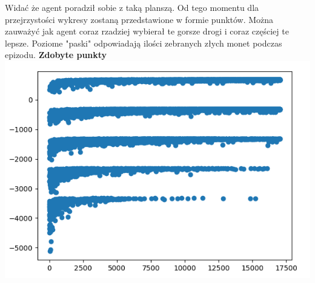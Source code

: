 \documentclass[a4paper,12pt]{article}
\begin{document}
Widać że agent poradził sobie z taką planszą. Od tego momentu dla przejrzystości wykresy zostaną przedstawione w formie punktów. Można zauważyć jak agent coraz rzadziej wybierał te gorsze drogi i coraz częściej te lepsze. Poziome "paski" odpowiadają ilości zebranych złych monet podczas epizodu. \newline \newline
\textbf{\Large{Zdobyte punkty}} \newline
\includegraphics[scale=0.9]{testy/wykres4.png}
\newline \newline
\end{document}
